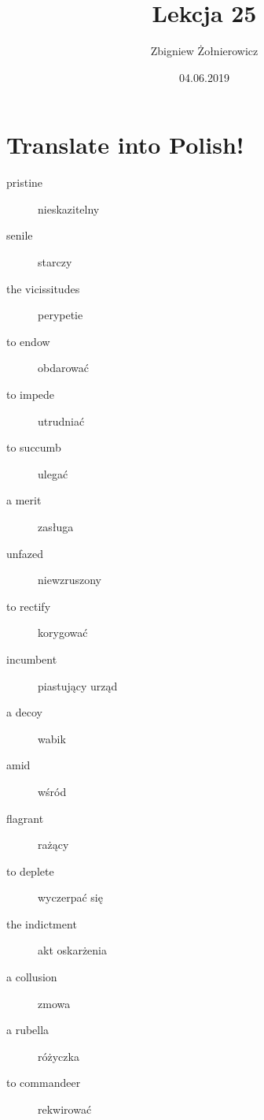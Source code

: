 \documentclass[a4paper]{article}
\begin{document}
\title{{\huge Lekcja 25}}
\author{Zbigniew Żołnierowicz}
\date{04.06.2019}
\maketitle
\section{Translate into Polish!}
\begin{description}
    \item[pristine] nieskazitelny
    \item[senile] starczy
    \item[the vicissitudes] perypetie
    \item[to endow] obdarować
    \item[to impede] utrudniać
    \item[to succumb] ulegać
    \item[a merit] zasługa
    \item[unfazed] niewzruszony
    \item[to rectify] korygować
    \item[incumbent] piastujący urząd
    \item[a decoy] wabik
    \item[amid] wśród
    \item[flagrant] rażący
    \item[to deplete] wyczerpać się
    \item[the indictment] akt oskarżenia
    \item[a collusion] zmowa
    \item[a rubella] różyczka
    \item[to commandeer] rekwirować
\end{description}
\end{document}
